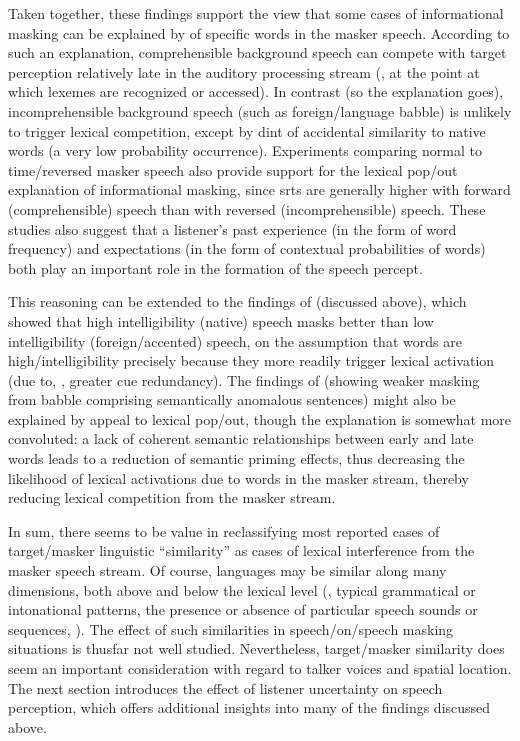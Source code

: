 Taken together, these findings support the view that some cases of informational masking can be explained by  of specific words in the masker speech.  According to such an explanation, comprehensible background speech can compete with target perception relatively late in the auditory processing stream (\ie, at the point at which lexemes are recognized or accessed).  In contrast (so the explanation goes), incomprehensible background speech (such as foreign\-/language babble) is unlikely to trigger lexical competition, except by dint of accidental similarity to native words (a very low probability occurrence).  Experiments comparing normal to time\-/reversed masker speech also provide support for the lexical pop\-/out explanation of informational masking, since \ac{srt}s are generally higher with forward (comprehensible) speech than with reversed (incomprehensible) speech.\footnotemark{}  These studies also suggest that a listener’s past experience (in the form of word frequency) and expectations (in the form of contextual probabilities of words) both play an important role in the formation of the speech percept.

This reasoning can be extended to the findings of \citealt{CalandruccioEtAl2010} (discussed above), which showed that high intelligibility (native) speech masks better than low intelligibility (foreign\-/accented) speech, on the assumption that words are high\-/intelligibility precisely because they more readily trigger lexical activation (due to, \eg, greater cue redundancy).  The findings of \citealt{BrouwerEtAl2012} (showing weaker masking from babble comprising semantically anomalous sentences) might also be explained by appeal to lexical pop\-/out, though the explanation is somewhat more convoluted: a lack of coherent semantic relationships between early and late words leads to a reduction of semantic priming effects, thus decreasing the likelihood of lexical activations due to words in the masker stream, thereby reducing lexical competition from the masker stream.  

In sum, there seems to be value in reclassifying most reported cases of target\-/masker linguistic “similarity” as cases of lexical interference from the masker speech stream.\footnotemark{}  Of course, languages may be similar along many dimensions, both above and below the lexical level (\eg, typical grammatical or intonational patterns, the presence or absence of particular speech sounds or sequences, \etc).  The effect of such similarities in speech\-/on\-/speech masking situations is thusfar not well studied.  Nevertheless, target\-/masker similarity does seem an important consideration with regard to talker voices and spatial location.  The next section introduces the effect of listener uncertainty on speech perception, which offers additional insights into many of the findings discussed above.
 
